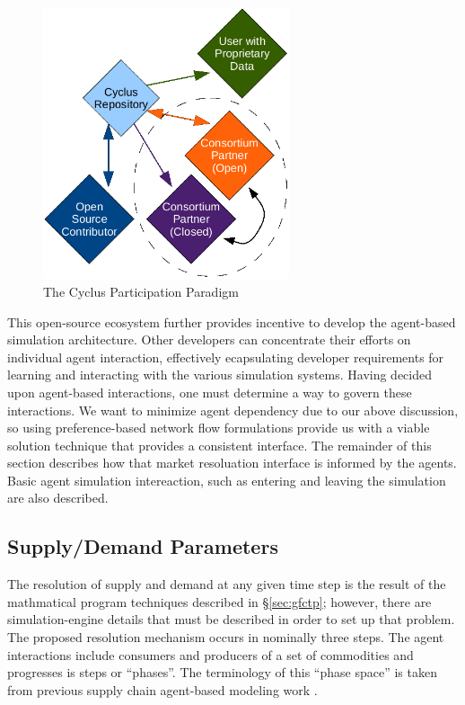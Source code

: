 \begin{figure}[htbp!]
  \begin{center}
    \includegraphics[height=8cm]{./chapters/research/community.png}
  \end{center}
  \caption{The Cyclus Participation Paradigm} 
  \label{fig:community}
\end{figure}

This open-source ecosystem further provides incentive to develop the agent-based
simulation architecture. Other developers can concentrate their efforts on
individual agent interaction, effectively ecapsulating developer requirements
for learning and interacting with the various simulation systems. Having decided
upon agent-based interactions, one must determine a way to govern these
interactions. We want to minimize agent dependency due to our above discussion,
so using preference-based network flow formulations provide us with a viable
solution technique that provides a consistent interface. The remainder of this
section describes how that market resoluation interface is informed by the
agents. Basic agent simulation intereaction, such as entering and leaving the
simulation are also described.

\subsection{Supply/Demand Parameters}

The resolution of supply and demand at any given time step is the result of the
mathmatical program techniques described in \S\ref{sec:gfctp}; however, there
are simulation-engine details that must be described in order to set up that
problem. The proposed resolution mechanism occurs in nominally three steps. The
agent interactions include consumers and producers of a set of commodities and
progresses is steps or ``phases''. The terminology of this ``phase space'' is
taken from previous supply chain agent-based modeling
work \cite{julka_agent-based_2002}.

